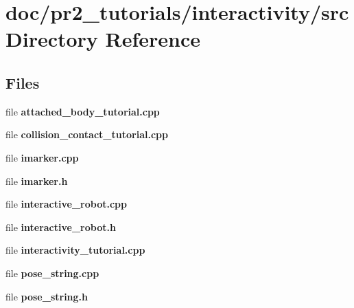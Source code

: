 \section{doc/pr2\-\_\-tutorials/interactivity/src Directory Reference}
\label{dir_4a24e5c58437e27fc6a6242dd032cac5}
\subsection*{Files}
\begin{DoxyCompactItemize}
\item 
file {\bfseries attached\-\_\-body\-\_\-tutorial.\-cpp}
\item 
file {\bfseries collision\-\_\-contact\-\_\-tutorial.\-cpp}
\item 
file {\bfseries imarker.\-cpp}
\item 
file {\bfseries imarker.\-h}
\item 
file {\bfseries interactive\-\_\-robot.\-cpp}
\item 
file {\bfseries interactive\-\_\-robot.\-h}
\item 
file {\bfseries interactivity\-\_\-tutorial.\-cpp}
\item 
file {\bfseries pose\-\_\-string.\-cpp}
\item 
file {\bfseries pose\-\_\-string.\-h}
\end{DoxyCompactItemize}

